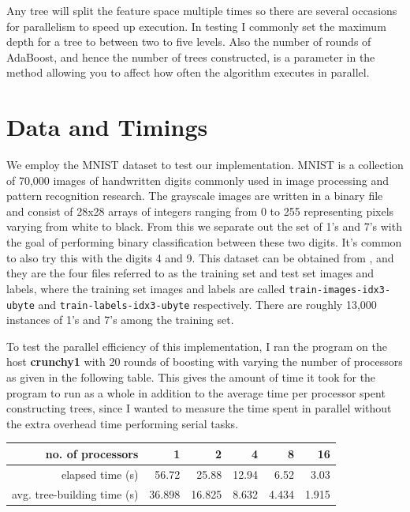 \documentclass[12pt]{article}
\begin{document}


Any tree will split the feature space multiple times so
there are several occasions for parallelism to speed up execution. In testing I
commonly set the maximum depth for a tree to between two to five levels. Also
the number of rounds of AdaBoost, and hence the number of trees constructed, is
a parameter in the method allowing you to affect how often the algorithm executes in parallel.




\section{Data and Timings}
We employ the MNIST dataset \cite{MNIST} to test our implementation. MNIST is a collection of 70,000 images of handwritten digits commonly used in image processing and pattern recognition research. The grayscale images are written in a binary file and consist of 28x28 arrays of integers ranging from 0 to 255 representing pixels varying from white to black. From this we separate out the set of 1's and 7's with the goal of performing binary classification between these two digits. It's common to also try this with the digits 4 and 9. This dataset can be obtained from \cite{MNIST}, and they are the four files referred to as the training set and test set images and labels, where the training set images and labels are called {\tt train-images-idx3-ubyte} and {\tt train-labels-idx3-ubyte} respectively. There are roughly 13,000 instances of 1's and 7's among the training set.

To test the parallel efficiency of this implementation, I ran the program on the host {\bf crunchy1} with 20 rounds of boosting with varying the number of processors as given in the following table. This gives the amount of time it took for the program to run as a whole in addition to the average time per processor spent constructing trees, since I wanted to measure the time spent in parallel without the extra overhead time performing serial tasks.

\begin{center}
\begin{tabular}{|r|r|r|r|r|r|}
\hline
no. of processors &1&2&4&8&16\\ \hline
elapsed time (s) &56.72 &25.88 &12.94 &6.52 &3.03 \\ \hline
avg. tree-building time (s) &36.898 &16.825 &8.632 &4.434 &1.915 \\ \hline
\end{tabular}
\end{center}
\end{document}
